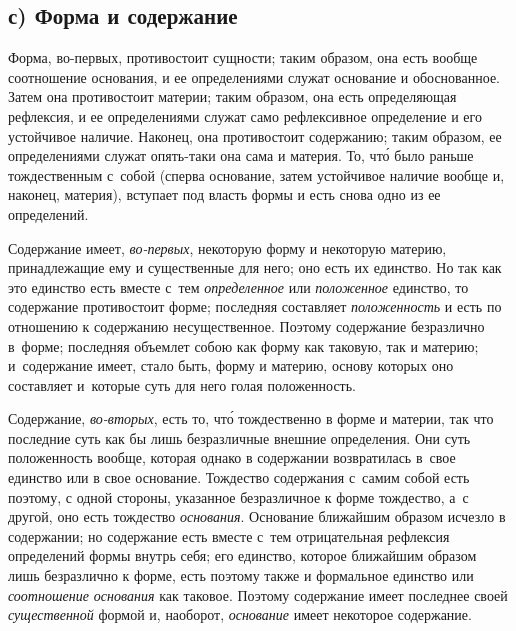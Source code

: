\subsection[с) Форма и содержание]{с) Форма и содержание}

Форма, во-первых, противостоит сущности; таким образом, она есть вообще
соотношение основания, и ее определениями служат основание и обоснованное.
Затем она противостоит материи; таким образом, она есть определяющая рефлексия,
и ее определениями служат само рефлексивное определение и его устойчивое
наличие. Наконец, она противостоит содержанию; таким образом, ее определениями
служат опять-таки она сама и материя. То, чт\'{о} было раньше тождественным
с~собой (сперва основание, затем устойчивое наличие вообще и, наконец,
материя), вступает под власть формы и есть снова одно из ее определений.

Содержание имеет, {\em во-первых}, некоторую форму и некоторую материю,
принадлежащие ему и существенные для него; оно есть их единство. Но так как это
единство есть вместе с~тем {\em определенное} или {\em положенное} единство, то
содержание противостоит форме; последняя составляет {\em положенность} и есть
по отношению к содержанию несущественное. Поэтому содержание безразлично
в~форме; последняя объемлет собою как форму как таковую, так и материю;
и~содержание имеет, стало быть, форму и материю, основу которых оно составляет
и~которые суть для него голая положенность.

Содержание, {\em во-вторых}, есть то, чт\'{о} тождественно в форме и материи,
так что последние суть как бы лишь безразличные внешние определения. Они суть
положенность вообще, которая однако в содержании возвратилась в~свое единство
или в свое основание. Тождество содержания с~самим собой есть поэтому, с одной
стороны, указанное безразличное к форме тождество, а~с другой, оно есть
тождество {\em основания}. Основание ближайшим образом исчезло в содержании; но
содержание есть вместе с~тем отрицательная рефлексия определений формы внутрь
себя; его единство, которое ближайшим образом лишь безразлично к форме, есть
поэтому также и формальное единство или {\em соотношение основания} как
таковое. Поэтому содержание имеет последнее своей {\em существенной} формой и,
наоборот, {\em основание} имеет некоторое содержание.

